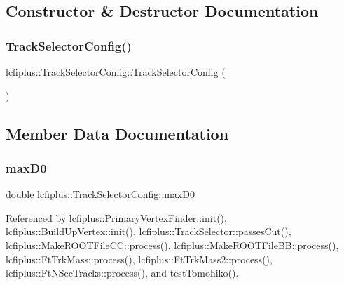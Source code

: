 \subsection{Constructor \& Destructor Documentation}
\mbox{\label{classlcfiplus_1_1TrackSelectorConfig_af839e21609a9dd75d0305bf2dd300b73}} 
\subsubsection{Track\+Selector\+Config()}
{\footnotesize\ttfamily lcfiplus\+::\+Track\+Selector\+Config\+::\+Track\+Selector\+Config (\begin{DoxyParamCaption}{ }\end{DoxyParamCaption})\hspace{0.3cm}{\ttfamily [inline]}}



\subsection{Member Data Documentation}
\mbox{\label{classlcfiplus_1_1TrackSelectorConfig_a67a0a45eab53924124ed88eba18588e8}} 
\subsubsection{max\+D0}
{\footnotesize\ttfamily double lcfiplus\+::\+Track\+Selector\+Config\+::max\+D0}



Referenced by lcfiplus\+::\+Primary\+Vertex\+Finder\+::init(), lcfiplus\+::\+Build\+Up\+Vertex\+::init(), lcfiplus\+::\+Track\+Selector\+::passes\+Cut(), lcfiplus\+::\+Make\+R\+O\+O\+T\+File\+C\+C\+::process(), lcfiplus\+::\+Make\+R\+O\+O\+T\+File\+B\+B\+::process(), lcfiplus\+::\+Ft\+Trk\+Mass\+::process(), lcfiplus\+::\+Ft\+Trk\+Mass2\+::process(), lcfiplus\+::\+Ft\+N\+Sec\+Tracks\+::process(), and test\+Tomohiko().

\mbox{\label{classlcfiplus_1_1TrackSelectorConfig_ae87369738d0befbec649b5102966620b}} 

